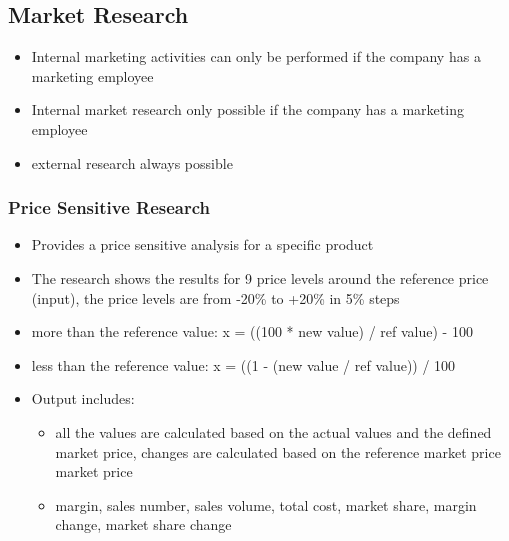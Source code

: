 \documentclass[11pt,titlepage,oneside,openany]{book}
\begin{document}
\subsection{Market Research}
\begin{itemize}
    \item Internal marketing activities can only be performed if the company has a marketing employee
    \item Internal market research only possible if the company has a marketing employee
    \item external research always possible 
\end{itemize}

\subsubsection{Price Sensitive Research}
    \begin{itemize}
        \item Provides a price sensitive analysis for a specific product
        \item The research shows the results for 9 price levels around the reference price (input), the price levels are from -20\% to +20\% in 5\% steps
        \item more than the reference value: x = ((100 * new value) / ref value) - 100
        \item less than the reference value: x = ((1 - (new value / ref value)) / 100
        \item Output includes: 
        \begin{itemize}
            \item all the values are calculated based on the actual values and the defined market price, changes are calculated based on the reference market price 
            market price
            \item margin, sales number, sales volume, total cost, market share, margin change, market share change
        \end{itemize}
        \end{itemize}
       
\end{document}
